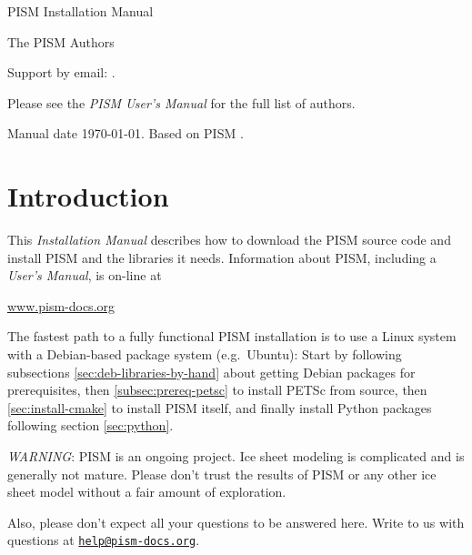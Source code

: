 \documentclass[titlepage,letterpaper,final]{scrartcl}
\begin{document}
\begin{titlepage}

  \begin{center}
    \vspace*{3.5cm}
    {\huge{} PISM Installation Manual}
    \vspace{0.5cm}

    {\Large The PISM Authors}
    \vspace{1cm}
  \end{center}

\setcounter{tocdepth}{3}
\small
\tableofcontents
\normalsize

\vspace{0.3in}

  \begin{center}
    \small Support by email: \PISMEMAIL.

    \medskip
    Please see the \emph{PISM User's Manual} for the full list of authors.

    \medskip
    Manual date \today.  Based on PISM \PISMREV.

    \medskip
    \PISMDOWNLOADMSG
 \end{center}

\end{titlepage}

\section{Introduction}

\large
This \emph{Installation Manual} describes how to download the PISM source code and install PISM and the libraries it needs.  Information about PISM, including a \emph{User's Manual}, is on-line at
\bigskip
\begin{center}
  \href{http://www.pism-docs.org}{www.pism-docs.org}
\end{center}
\bigskip
\noindent The fastest path to a fully functional PISM installation is to use a Linux system with a Debian-based package system (e.g.~Ubuntu):  Start by following subsections \ref{sec:deb-libraries-by-hand} about getting Debian packages for prerequisites, then \ref{subsec:prereq-petsc} to install PETSc from source, then \ref{sec:install-cmake} to install PISM itself, and finally install Python packages following section \ref{sec:python}.

\vfill

\large
\begin{center}
\parbox{5.5in}{ \emph{WARNING}:  PISM is an ongoing project.  Ice sheet modeling is complicated and is generally not mature.  Please don't trust the results of PISM or any other ice sheet model without a fair amount of exploration.

\bigskip
Also, please don't expect all your questions to be answered here.  Write to us with questions at \href{mailto:help@pism-docs.org}{\texttt{help@pism-docs.org}}.}
\normalsize
\end{center}
\normalsize
\vfill
\end{document}
